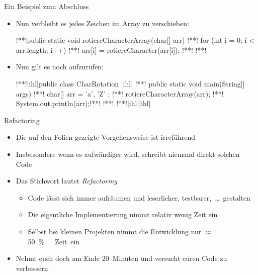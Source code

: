 \begin{frame}[fragile]{Ein Beispiel zum Abschluss}
\SetupLstHl
\begin{itemize}[<+(1)->]
    \itemsep3pt
    \item Nun verbleibt es jedes Zeichen im Array zu verschieben:
\begin{plainjava}
!**!public static void rotiereCharacterArray(char[] arr) {
!**!    for (int i = 0; i < arr.length; i++) {
!**!        arr[i] = rotiereCharacter(arr[i]);
!**!    }
!**!}
\end{plainjava}
    \item<6-> Nun gilt es noch aufzurufen:
\begin{plainjava}
!**!|ihl|public class CharRotation {|ihl|
!**!    public static void main(String[] args) {
!**!        char[] arr = { 'a', 'Z' };
!**!        rotiereCharacterArray(arr);
!**!        System.out.println(arr);!**!
!**!    }
!**!|ihl|}|ihl|
\end{plainjava}
\end{itemize}
\end{frame}

{\AddonFrame
\begin{frame}{Refactoring}
 \begin{itemize}[<+(1)->]
    \itemsep9pt
     \item Die auf den Folien gezeigte Vorgehensweise ist irreführend
     \item Insbesondere wenn es aufwändiger wird, schreibt niemand direkt solchen Code
     \item Das Stichwort lautet \textit{Refactoring}
        \begin{itemize}
            \itemsep4pt
            \item Code lässt sich immer aufräumen und leserlicher, testbarer,~\ldots\ gestalten
            \item Die eigentliche Implementierung nimmt relativ wenig Zeit ein 
            \item Selbst bei kleinen Projekten  nimmt die Entwicklung nur $\approx$\qty{50}\percent\ Zeit ein
        \end{itemize}
     \item Nehmt euch doch am Ende 20~Minuten und versucht euren Code zu verbessern
 \end{itemize}
\end{frame}
}

